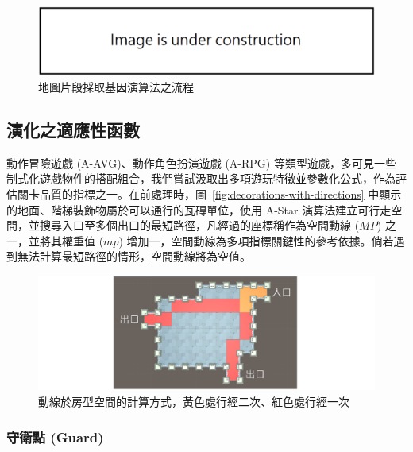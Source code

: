 \begin{figure}[ht]
  \begin{center}
    \includegraphics[width=1.0\textwidth]{figures/under_construction.png}
    \caption{地圖片段採取基因演算法之流程} 
    \label{fig:segments-with-ga}
  \end{center}
\end{figure}

\subsection{演化之適應性函數}
\label{ssec:method-segments-fitnesses}

動作冒險遊戲 (A-AVG)、動作角色扮演遊戲 (A-RPG) 等類型遊戲，多可見一些制式化遊戲物件的搭配組合，我們嘗試汲取出多項遊玩特徵並參數化公式，作為評估關卡品質的指標之一。在前處理時，圖~\ref{fig:decorations-with-directions} 中顯示的地面、階梯裝飾物屬於可以通行的瓦磚單位，使用 A-Star 演算法建立可行走空間，並搜尋入口至多個出口的最短路徑，凡經過的座標稱作為空間動線 ($MP$) 之一，並將其權重值 ($mp$) 增加一，空間動線為多項指標關鍵性的參考依據。倘若遇到無法計算最短路徑的情形，空間動線將為空值。

\begin{figure}[ht]
  \begin{center}
    \includegraphics[width=1.0\textwidth]{figures/fitnesses-mainpath.png}
    \caption{動線於房型空間的計算方式，黃色處行經二次、紅色處行經一次}
    \label{fig:fitnesses-mainpath}
  \end{center}
\end{figure}

\subsubsection{守衛點 (Guard)}
\label{sssec:method-segments-fitnesses-guard}


